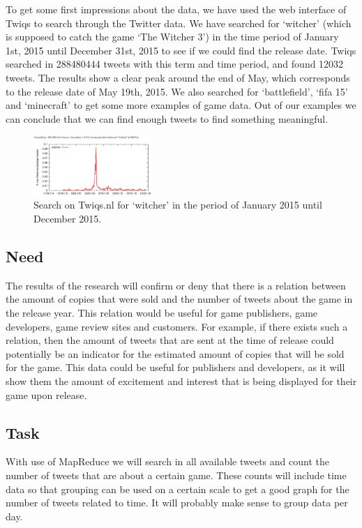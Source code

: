 To get some first impressions about the data, we have used the web interface of Twiqs to search through the Twitter data. We have searched for ‘witcher’ (which is supposed to catch the game ‘The Witcher 3’) in the time period of January 1st, 2015 until December 31st, 2015 to see if we could find the release date. Twiqs searched in 288480444 tweets with this term and time period, and found 12032 tweets. The results show a clear peak around the end of May, which corresponds to the release date of May 19th, 2015. We also searched for ‘battlefield’, ‘fifa 15’ and ‘minecraft’ to get some more examples of game data. Out of our examples we can conclude that we can find enough tweets to find something meaningful.
\begin{figure}[!ht]
	\centering
		\includegraphics[width=0.4\textwidth]{twiqswitcher}
	\caption{Search on Twiqs.nl for ‘witcher’ in the period of January 2015 until December 2015.}
\end{figure}
\subsection{Need}
The results of the research will confirm or deny that there is a relation between the amount of copies that were sold and the number of tweets about the game in the release year. This relation would be useful for game publishers, game developers, game review sites and customers. For example, if there exists such a relation, then the amount of tweets that are sent at the time of release could potentially be an indicator for the estimated amount of copies that will be sold for the game. This data could be useful for publishers and developers, as it will show them the amount of excitement and interest that is being displayed for their game upon release.
\subsection{Task}
With use of MapReduce we will search in all available tweets and count the number of tweets that are about a certain game. These counts will include time data so that grouping can be used on a certain scale to get a good graph for the number of tweets related to time. It will probably make sense to group data per day. 
